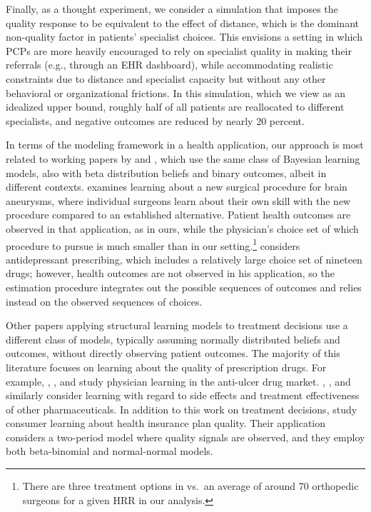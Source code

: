 \documentclass[12pt]{article}
\begin{document}
Finally, as a thought experiment, we consider a simulation that imposes the quality response to be equivalent to the effect of distance, which is the dominant non-quality factor in patients' specialist choices. This envisions a setting in which PCPs are more heavily encouraged to rely on specialist quality in making their referrals (e.g., through an EHR dashboard), while accommodating realistic constraints due to distance and specialist capacity but without any other behavioral or organizational frictions. In this simulation, which we view as an idealized upper bound, roughly half of all patients are reallocated to different specialists, and negative outcomes are reduced by nearly 20 percent.

In terms of the modeling framework in a health application, our approach is most related to working papers by \cite{gong2018} and \cite{dickstein2018}, which use the same class of Bayesian learning models, also with beta distribution beliefs and binary outcomes, albeit in different contexts. \cite{gong2018} examines learning about a new surgical procedure for brain aneurysms, where individual surgeons learn about their own skill with the new procedure compared to an established alternative. Patient health outcomes are observed in that application, as in ours, while the physician's choice set of which procedure to pursue is much smaller than in our setting.\footnote{There are three treatment options in \cite{gong2018} vs.~an average of around 70 orthopedic surgeons for a given HRR in our analysis.} \cite{dickstein2018} considers antidepressant prescribing, which includes a relatively large choice set of nineteen drugs; however, health outcomes are not observed in his application, so the estimation procedure integrates out the possible sequences of outcomes and relies instead on the observed sequences of choices.

Other papers applying structural learning models to treatment decisions use a different class of models, typically assuming normally distributed beliefs and outcomes, without directly observing patient outcomes. The majority of this literature focuses on learning about the quality of prescription drugs. For example, \cite{coscelli2004}, \cite{crawford2005}, and \cite{ferreyra2011} study physician learning in the anti-ulcer drug market. \cite{ching2010}, \cite{chan2013}, and \cite{dickstein2018} similarly consider learning with regard to side effects and treatment effectiveness of other pharmaceuticals. In addition to this work on treatment decisions, \cite*{chernew2008} study consumer learning about health insurance plan quality. Their application considers a two-period model where quality signals are observed, and they employ both beta-binomial and normal-normal models.
\end{document}
